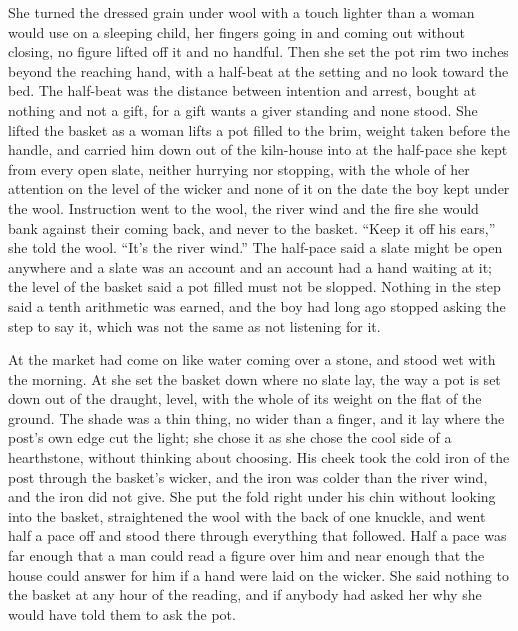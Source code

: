 She turned the dressed grain under wool with a touch lighter than a woman would use on a sleeping child, her fingers going in and coming out without closing, no figure lifted off it and no handful. Then she set the pot rim two inches beyond the reaching hand, with a half-beat at the setting and no look toward the bed. The half-beat was the distance between intention and arrest, bought at nothing and not a gift, for a gift wants a giver standing and none stood. She lifted the basket as a woman lifts a pot filled to the brim, weight taken before the handle, and carried him down out of the kiln-house into  at the half-pace she kept from every open slate, neither hurrying nor stopping, with the whole of her attention on the level of the wicker and none of it on the date the boy kept under the wool. Instruction went to the wool, the river wind and the fire she would bank against their coming back, and never to the basket. “Keep it off his ears,” she told the wool. “It's the river wind.” The half-pace said a slate might be open anywhere and a slate was an account and an account had a hand waiting at it; the level of the basket said a pot filled must not be slopped. Nothing in the step said a tenth arithmetic was earned, and the boy had long ago stopped asking the step to say it, which was not the same as not listening for it.

\scenebreak

At  the market had come on like water coming over a stone, and  stood wet with the morning. At  she set the basket down where no slate lay, the way a pot is set down out of the draught, level, with the whole of its weight on the flat of the ground. The shade was a thin thing, no wider than a finger, and it lay where the post's own edge cut the light; she chose it as she chose the cool side of a hearthstone, without thinking about choosing. His cheek took the cold iron of the post through the basket's wicker, and the iron was colder than the river wind, and the iron did not give. She put the fold right under his chin without looking into the basket, straightened the wool with the back of one knuckle, and went half a pace off and stood there through everything that followed. Half a pace was far enough that a man could read a figure over him and near enough that the house could answer for him if a hand were laid on the wicker. She said nothing to the basket at any hour of the reading, and if anybody had asked her why she would have told them to ask the pot.

